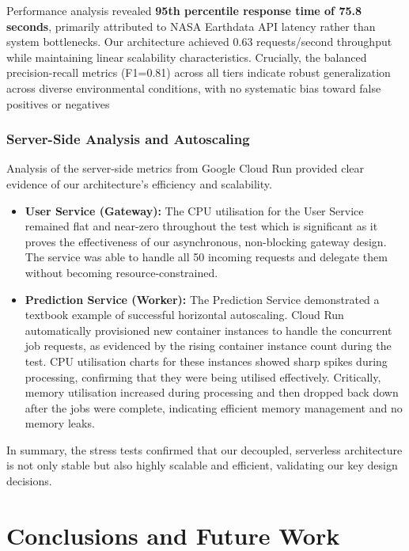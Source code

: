 \documentclass[conference]{IEEEtran}
\begin{document}
Performance analysis revealed \textbf{95th percentile response time of 75.8 seconds}, primarily attributed to NASA Earthdata API latency rather than system bottlenecks. Our architecture achieved 0.63 requests/second throughput while maintaining linear scalability characteristics. Crucially, the balanced precision-recall metrics (F1=0.81) across all tiers indicate robust generalization across diverse environmental conditions, with no systematic bias toward false positives or negatives

\subsubsection{Server-Side Analysis and Autoscaling}
Analysis of the server-side metrics from Google Cloud Run provided clear evidence of our architecture's efficiency and scalability.
\begin{itemize}
    \item \textbf{User Service (Gateway):} The CPU utilisation for the User Service remained flat and near-zero throughout the test which is significant as it proves the effectiveness of our asynchronous, non-blocking gateway design. The service was able to handle all 50 incoming requests and delegate them without becoming resource-constrained.
    \item \textbf{Prediction Service (Worker):} The Prediction Service demonstrated a textbook example of successful horizontal autoscaling. Cloud Run automatically provisioned new container instances to handle the concurrent job requests, as evidenced by the rising container instance count during the test. CPU utilisation charts for these instances showed sharp spikes during processing, confirming that they were being utilised effectively. Critically, memory utilisation increased during processing and then dropped back down after the jobs were complete, indicating efficient memory management and no memory leaks.
\end{itemize}
In summary, the stress tests confirmed that our decoupled, serverless architecture is not only stable but also highly scalable and efficient, validating our key design decisions.

\section{Conclusions and Future Work}
\end{document}

